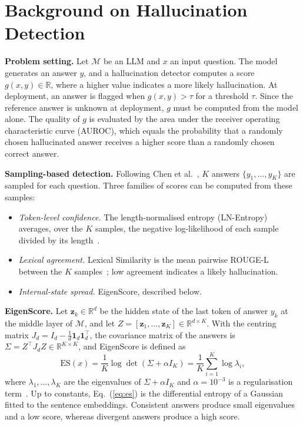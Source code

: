\documentclass[conference]{IEEEtran}
\begin{document}
\section{Background on Hallucination Detection}\label{sec:background}
\textbf{Problem setting.} Let $\mathcal{M}$ be an LLM and $x$ an input question. The model generates an answer $y$, and a hallucination detector computes a score $g(x,y)\in\mathbb{R}$, where a higher value indicates a more likely hallucination. At deployment, an answer is flagged when $g(x,y)>\tau$ for a threshold $\tau$. Since the reference answer is unknown at deployment, $g$ must be computed from the model alone. The quality of $g$ is evaluated by the area under the receiver operating characteristic curve (AUROC), which equals the probability that a randomly chosen hallucinated answer receives a higher score than a randomly chosen correct answer.

\textbf{Sampling-based detection.} Following Chen et al.~\cite{chen2024inside}, $K$ answers $\{y_1,\dots,y_K\}$ are sampled for each question. Three families of scores can be computed from these samples:
\begin{itemize}
\item \emph{Token-level confidence.} The length-normalised entropy (LN-Entropy) averages, over the $K$ samples, the negative log-likelihood of each sample divided by its length~\cite{malinin2021}.
\item \emph{Lexical agreement.} Lexical Similarity is the mean pairwise ROUGE-L~\cite{lin2004rouge} between the $K$ samples~\cite{lin2023generating}; low agreement indicates a likely hallucination.
\item \emph{Internal-state spread.} EigenScore, described below.
\end{itemize}

\textbf{EigenScore.} Let $\mathbf{z}_k\in\mathbb{R}^d$ be the hidden state of the last token of answer $y_k$ at the middle layer of $\mathcal{M}$, and let $Z=[\mathbf{z}_1,\dots,\mathbf{z}_K]\in\mathbb{R}^{d\times K}$. With the centring matrix $J_d=I_d-\frac1d\mathbf{1}_d\mathbf{1}_d^\top$, the covariance matrix of the answers is $\Sigma=Z^\top J_d Z\in\mathbb{R}^{K\times K}$, and EigenScore is defined as
\begin{equation}
\mathrm{ES}(x)=\frac{1}{K}\log\det\left(\Sigma+\alpha I_K\right)=\frac{1}{K}\sum_{i=1}^{K}\log\lambda_i ,
\label{eq:es}
\end{equation}
where $\lambda_1,\dots,\lambda_K$ are the eigenvalues of $\Sigma+\alpha I_K$ and $\alpha=10^{-3}$ is a regularisation term~\cite{chen2024inside}. Up to constants, Eq.~(\ref{eq:es}) is the differential entropy of a Gaussian fitted to the sentence embeddings. Consistent answers produce small eigenvalues and a low score, whereas divergent answers produce a high score.
\end{document}
